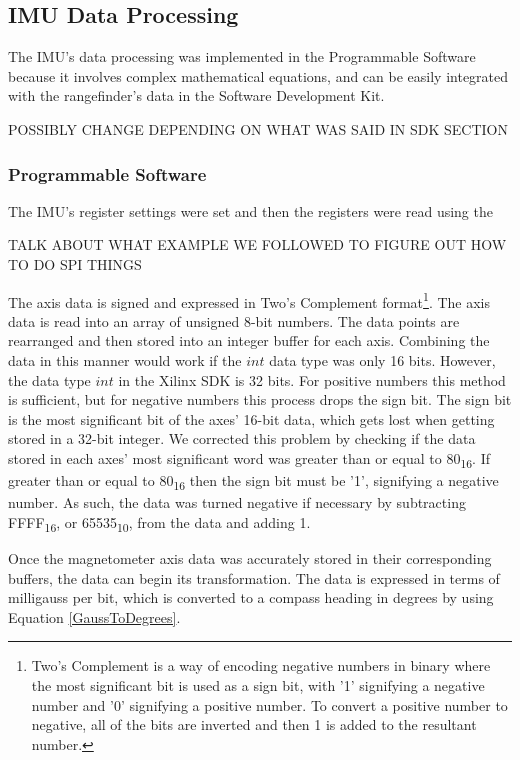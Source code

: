 \subsection{IMU Data Processing}
The IMU's data processing was implemented in the Programmable Software because it involves complex mathematical equations, and can be easily integrated with the rangefinder's data in the Software Development Kit.
\par
POSSIBLY CHANGE DEPENDING ON WHAT WAS SAID IN SDK SECTION

\subsubsection{Programmable Software}
The IMU's register settings were set and then the registers were read using the 
\par
TALK ABOUT WHAT EXAMPLE WE FOLLOWED TO FIGURE OUT HOW TO DO SPI THINGS

\par
The axis data is signed and expressed in Two's Complement format\footnote{Two's Complement is a way of encoding negative numbers in binary where the most significant bit is used as a sign bit, with '1' signifying a negative number and '0' signifying a positive number. To convert a positive number to negative, all of the bits are inverted and then 1 is added to the resultant number\cite{2sComp}.}. The axis data is read into an array of unsigned 8-bit numbers. The data points are rearranged and then stored into an integer buffer for each axis. Combining the data in this manner would work if the $int$ data type was only 16 bits. However, the data type $int$ in the Xilinx SDK is 32 bits. For positive numbers this method is sufficient, but for negative numbers this process drops the sign bit. The sign bit is the most significant bit of the axes' 16-bit data, which gets lost when getting stored in a 32-bit integer. We corrected this problem by checking if the data stored in each axes' most significant word was greater than or equal to 80\textsubscript{16}. If greater than or equal to 80\textsubscript{16} then the sign bit must be '1', signifying a negative number. As such, the data was turned negative if necessary by subtracting FFFF\textsubscript{16}, or 65535\textsubscript{10}, from the data and adding 1.
\par
Once the magnetometer axis data was accurately stored in their corresponding buffers, the data can begin its transformation. The data is expressed in terms of milligauss per bit, which is converted to a compass heading in degrees by using Equation \ref{GaussToDegrees}.

